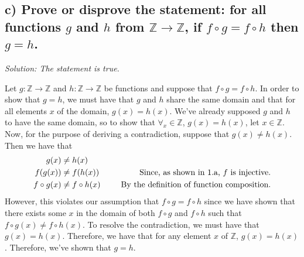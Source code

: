 \documentclass[11pt, letterpaper]{article}
\begin{document}
\subsection*{c) Prove or disprove the statement: for all functions $g$ and $h$ from $\mathbb{Z}\rightarrow\mathbb{Z}$, if $f\circ g=f\circ h$ then $g=h$.}
{\large\it Solution: The statement is true.}
\begin{prf}
    Let $g:\mathbb{Z}\rightarrow\mathbb{Z}$ and $h:\mathbb{Z}\rightarrow\mathbb{Z}$ be functions and suppose that $f\circ g=f\circ h$. In order to show that $g=h$, we must have that $g$ and $h$ share the same domain and that for all elements $x$ of the domain, $g(x)=h(x)$.
    We've already supposed $g$ and $h$ to have the same domain, so to show that $\forall_x\in\mathbb{Z}$, $g(x)=h(x)$, let $x\in\mathbb{Z}$. Now, for the purpose of deriving a contradiction, suppose that $g(x)\neq h(x)$. Then we have that
    \begin{align*}
        g(x)&\neq h(x)\\
        f(g(x)) &\neq f(h(x)) &\text{\indent Since, as shown in 1.a, $f$ is injective.}\\
        f\circ g(x)&\neq f\circ h(x) &\text{\indent By the definition of function composition.}
    \end{align*}
    However, this violates our assumption that $f\circ g=f\circ h$ since we have shown that there exists some $x$ in the domain of both $f\circ g$ and $f\circ h$ such that $f\circ g(x)\neq f\circ h(x)$. To resolve the contradiction, we must have that $g(x)=h(x)$. Therefore, we have that for any element $x$ of $\mathbb{Z}$, $g(x)=h(x)$. Therefore, we've shown that $g=h$. 
\end{prf}
\end{document}
